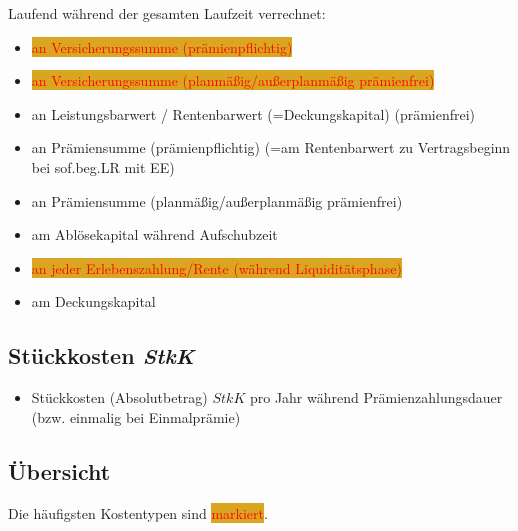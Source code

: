 \documentclass[a4paper,10pt]{article}
\newcommand{\markiert}[1]{\colorbox{Goldenrod}{\textcolor{red}{#1}}}
\begin{document}
Laufend während der gesamten Laufzeit verrechnet:

\begin{itemize}
 \item \markiert{an Versicherungssumme (prämienpflichtig)}
 \item \markiert{an Versicherungssumme (planmäßig/außerplanmäßig prämienfrei)}
 \item an Leistungsbarwert / Rentenbarwert (=Deckungskapital) (prämienfrei) %
 \item an Prämiensumme (prämienpflichtig) (=am Rentenbarwert zu Vertragsbeginn bei sof.beg.LR mit EE)
 \item an Prämiensumme (planmäßig/außerplanmäßig prämienfrei)
 
 \item am Ablösekapital während Aufschubzeit %
 \item \markiert{an jeder Erlebenszahlung/Rente (während Liquiditätsphase)} %
 \item am Deckungskapital %
\end{itemize}


\subsection{Stückkosten \textit{StkK}}

\begin{itemize}
 \item Stückkosten (Absolutbetrag) $StkK$ pro Jahr während Prämienzahlungsdauer (bzw. einmalig bei Einmalprämie)
\end{itemize}


\subsection{Übersicht}

Die häufigsten Kostentypen sind \markiert{markiert}.
\end{document}
